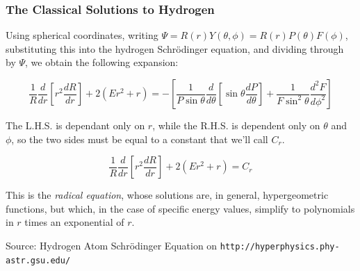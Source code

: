 \documentclass{beamer}
\begin{document}
\begin{frame}
\frametitle{The Classical Solutions to Hydrogen}
Using spherical coordinates, writing $\Psi=R(r)Y(\theta, \phi) = R(r)P(\theta)F(\phi)$,
substituting this into the hydrogen Schr\"odinger equation, and dividing through by $\Psi$,
we obtain the following expansion:


\begin{equation*}
\frac{1}{R} \frac{d}{dr}\left[ r^2 \frac{dR}{dr}\right] + 2(Er^2 + r)
= - \left[\frac{1}{P\sin\theta} \frac{d}{d\theta}\left[\sin\theta\frac{dP}{d\theta}\right]+\frac{1}{F\sin^2\theta}\frac{d^2 F}{d\phi^2}\right]
\end{equation*}

The L.H.S. is dependant only on $r$, while the R.H.S. is dependent only on $\theta$ and $\phi$, so the
two sides must be equal to a constant that we'll call $C_r$.

\begin{equation*}
\frac{1}{R} \frac{d}{dr}\left[ r^2 \frac{dR}{dr}\right] + 2(Er^2 + r) = C_r
\end{equation*}

This is the {\it radical equation}, whose solutions are, in general,
hypergeometric functions, but which, in the case of specific energy values,
simplify to polynomials in $r$ times an exponential of $r$.

Source: Hydrogen Atom Schr\"odinger Equation on {\tt http://hyperphysics.phy-astr.gsu.edu/}
\end{frame}
\end{document}
